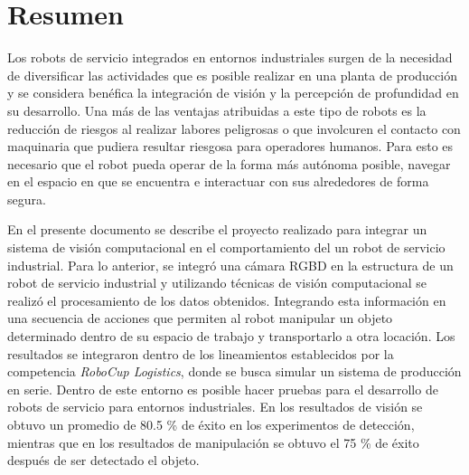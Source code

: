 \chapter*{Resumen}

Los robots de servicio integrados en entornos industriales surgen de la necesidad de diversificar las actividades que es posible realizar en una planta de producción y se considera benéfica la integración de visión y la percepción de profundidad en su desarrollo. Una más de las ventajas atribuidas a este tipo de robots es la reducción de riesgos al realizar labores peligrosas o que involcuren el contacto con maquinaria que pudiera resultar riesgosa para operadores humanos. Para esto es necesario que el robot pueda operar de la forma más autónoma posible, navegar en el espacio en que se encuentra e interactuar con sus alrededores de forma segura. 

En el presente documento se describe el proyecto realizado para integrar un sistema de visión computacional en el comportamiento del un robot de servicio industrial.
Para lo anterior, se integró una cámara RGBD en la estructura de un robot de servicio industrial y utilizando técnicas de visión computacional se realizó el procesamiento de los datos obtenidos. Integrando esta información en una secuencia de acciones que permiten al robot manipular un objeto determinado dentro de su espacio de trabajo y transportarlo a otra locación.
Los resultados se integraron dentro de los lineamientos establecidos por la competencia \textit{RoboCup Logistics}, donde se busca simular un sistema de producción en serie. Dentro de este entorno es posible hacer pruebas para el desarrollo de robots de servicio para entornos industriales. En los resultados de visión se obtuvo un promedio de  80.5 \% de éxito en los experimentos de detección, mientras que en los resultados de manipulación se obtuvo el 75 \% de éxito después de ser detectado el objeto.

